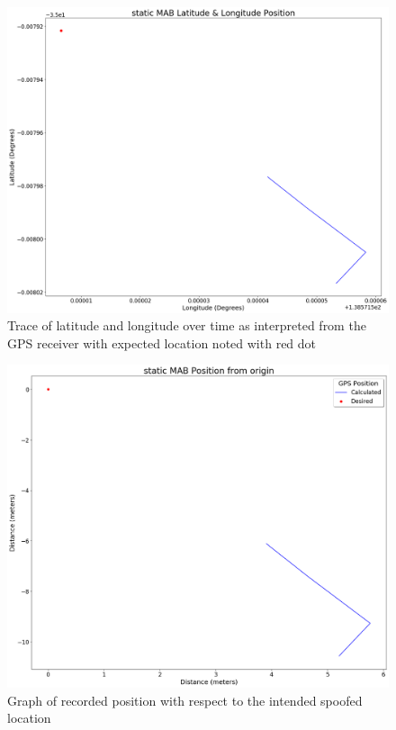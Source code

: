 \begin{figure}[H]
    \begin{centering}
        \includegraphics[width=14cm,keepaspectratio]{Figures/2021_3_30_static_MAB Lat long position.png}
        \caption{Trace of latitude and longitude over time as interpreted from the GPS receiver with expected location noted with red dot}
        \label{fig:MABStaticCoord}
    \end{centering}
\end{figure}

\begin{figure}[H]
    \begin{centering}
        \includegraphics[width=14cm,keepaspectratio]{Figures/2021_3_30_static_MAB Position from origin.png}
        \caption{Graph of recorded position with respect to the intended spoofed location}
        \label{fig:MABStaticPosition}
    \end{centering}
\end{figure}

